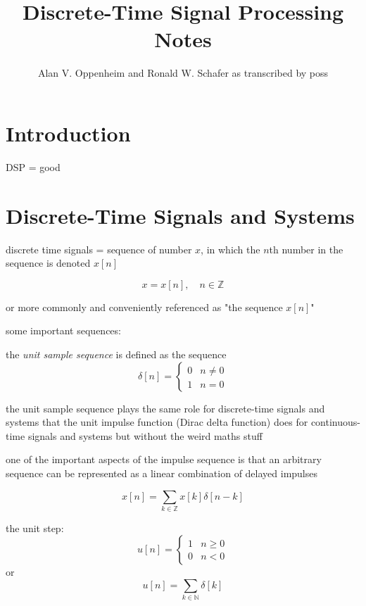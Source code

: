 \documentclass{article}
\title{Discrete-Time Signal Processing Notes}
\author{Alan V. Oppenheim and Ronald W. Schafer as transcribed by poss}
\begin{document}
\maketitle{}

\section{Introduction}

DSP = good

\section{Discrete-Time Signals and Systems}

discrete time signals = sequence of number \(x\), in which the \(n\)th number in the sequence is denoted \(x[n]\)

\[
	x = {x[n]}, \quad n \in \mathbb{Z} 
\]

or more commonly and conveniently referenced as "the sequence \(x[n]\)"


some important sequences:


the \textit{unit sample sequence} is defined as the sequence
\[
	\delta{}[n] =
	\begin{cases} 
		0 & n \neq 0 \\
		1 & n = 0
	\end{cases}
\]

the unit sample sequence plays the same role for discrete-time signals and systems that the unit impulse function (Dirac delta function) does for continuous-time signals and systems but without the weird maths stuff 


one of the important aspects of the impulse sequence is that an arbitrary sequence can be represented as a linear combination of delayed impulses

\[
	x[n] = \sum_{k \in \mathbb{Z}} x[k] \delta{}[n - k]
\]


the unit step:
\[
	u{}[n] =
	\begin{cases} 
		1 & n \geq{} 0\\
		0 & n < 0 
	\end{cases}
\]
or
\[
	u[n] = \sum_{k \in \mathbb{N}} \delta{}[k]
\]
\end{document}
